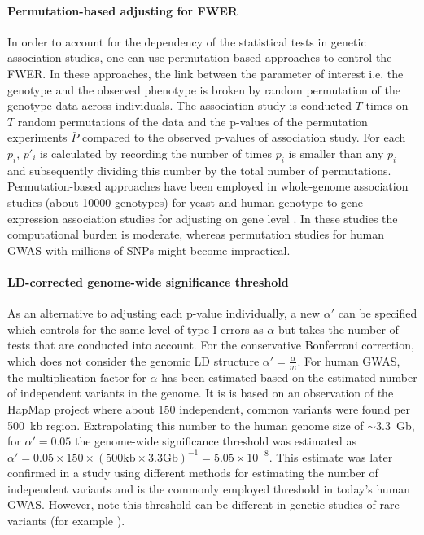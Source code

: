 \paragraph{Permutation-based adjusting for FWER}
In order to account for the dependency of the statistical tests in genetic association studies, one can use permutation-based approaches to control the FWER. In these approaches, the link between the parameter of interest i.e. the genotype and the observed phenotype is broken by random permutation of the genotype data across individuals.  The association study is conducted \(T\) times on \(T\)  random permutations of the data and the p-values of the permutation experiments \(\bar{P}\) compared to the observed p-values of association study. For each \(p_i\),   \(p'_i\)  is calculated by recording the number of times \(p_i\) is smaller than any \(\bar{p}_i\) and subsequently dividing this number by the total number of permutations. Permutation-based approaches have been employed in whole-genome association studies (about \num{10000} genotypes) for yeast \citep{Brem2002,Ehrenreich2010,Bloom2013} and human genotype to gene expression association studies for adjusting on gene level \citep{1000Genomes2015}. In these studies the computational burden is moderate, whereas permutation studies for human GWAS with millions of SNPs might become impractical. 

\paragraph{LD-corrected genome-wide significance threshold}
As an alternative to adjusting each p-value individually, a new \(\alpha '\) can be specified which controls for the same level of type I errors as \(\alpha\) but takes the number of tests that are conducted into account. For the conservative Bonferroni correction, which does not consider the genomic LD structure \(\alpha ' = \frac{\alpha}{m}\). 
For human GWAS, the multiplication factor for \(\alpha \) has been estimated based on the estimated number of independent variants in the genome.  It is is based on an observation of the HapMap project \citep{HapMap2005} where about \num{150} independent, common variants were found per \num{500}~kb region.  Extrapolating this number to the human genome size of \(\sim 3.3\)~Gb, for \(\alpha ' =0.05\) the genome-wide significance threshold was estimated as  \(\alpha '= 0.05 \times 150 \times \left(500\text{kb} \times 3.3 \text{Gb}\right)^{-1}= 5.05 \times 10^{-8}\). This estimate was later confirmed in a study using different methods for estimating the number of independent variants \citep{Fadista2016} and is the commonly employed threshold in today's human GWAS. However, note this threshold can be different in genetic studies of rare variants (for example \citep{Xu2014}).

